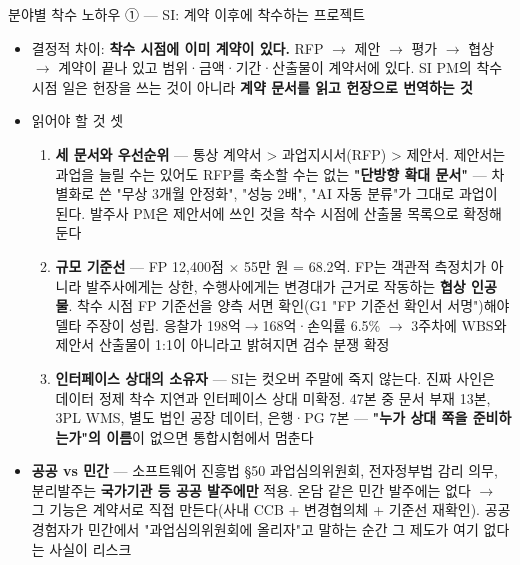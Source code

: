 \begin{frame}[allowframebreaks=1.0]{분야별 착수 노하우 ① — SI: 계약 이후에 착수하는 프로젝트}
\small
\begin{itemize}
\item\relax 결정적 차이: \textbf{착수 시점에 이미 계약이 있다.} RFP $\rightarrow$ 제안 $\rightarrow$ 평가 $\rightarrow$ 협상 $\rightarrow$ 계약이 끝나 있고 범위·금액·기간·산출물이 계약서에 있다. SI PM의 착수 시점 일은 헌장을 쓰는 것이 아니라 \textbf{계약 문서를 읽고 헌장으로 번역하는 것}
\item\relax 읽어야 할 것 셋
\par\nobreak
\begin{enumerate}
\item\relax \textbf{세 문서와 우선순위} — 통상 계약서 > 과업지시서(RFP) > 제안서. 제안서는 과업을 늘릴 수는 있어도 RFP를 축소할 수는 없는 \textbf{"단방향 확대 문서"} — 차별화로 쓴 "무상 3개월 안정화", "성능 2배", "AI 자동 분류"가 그대로 과업이 된다. 발주사 PM은 제안서에 쓰인 것을 착수 시점에 산출물 목록으로 확정해 둔다
\item\relax \textbf{규모 기준선} — FP 12,400점 $\times$ 55만 원 = 68.2억. FP는 객관적 측정치가 아니라 발주사에게는 상한, 수행사에게는 변경대가 근거로 작동하는 \textbf{협상 인공물}. 착수 시점 FP 기준선을 양측 서면 확인(G1 "FP 기준선 확인서 서명")해야 델타 주장이 성립. 응찰가 198억$\rightarrow$168억·손익률 6.5\% $\rightarrow$ 3주차에 WBS와 제안서 산출물이 1:1이 아니라고 밝혀지면 검수 분쟁 확정
\item\relax \textbf{인터페이스 상대의 소유자} — SI는 컷오버 주말에 죽지 않는다. 진짜 사인은 데이터 정제 착수 지연과 인터페이스 상대 미확정. 47본 중 문서 부재 13본, 3PL WMS, 별도 법인 공장 데이터, 은행·PG 7본 — \textbf{"누가 상대 쪽을 준비하는가"의 이름}이 없으면 통합시험에서 멈춘다
\end{enumerate}
\item\relax \textbf{공공 vs 민간} — 소프트웨어 진흥법 §50 과업심의위원회, 전자정부법 감리 의무, 분리발주는 \textbf{국가기관 등 공공 발주에만} 적용. 온담 같은 민간 발주에는 없다 $\rightarrow$ 그 기능은 계약서로 직접 만든다(사내 CCB + 변경협의체 + 기준선 재확인). 공공 경험자가 민간에서 "과업심의위원회에 올리자"고 말하는 순간 그 제도가 여기 없다는 사실이 리스크
\end{itemize}
\end{frame}

